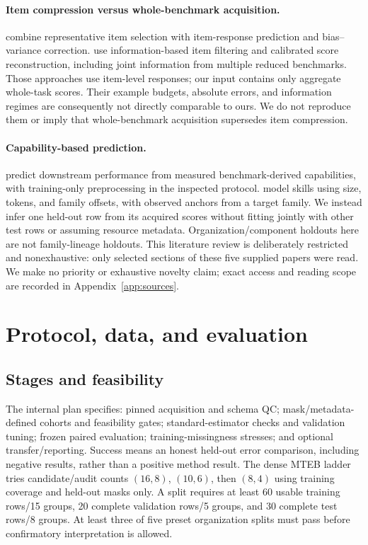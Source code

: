 \documentclass{article}
\begin{document}
\paragraph{Item compression versus whole-benchmark acquisition.}
\citet{maiapolo2024tinybenchmarks} combine representative item selection with item-response prediction and bias--variance correction. \citet{kipnis2024metabench} use information-based item filtering and calibrated score reconstruction, including joint information from multiple reduced benchmarks. Those approaches use item-level responses; our input contains only aggregate whole-task scores. Their example budgets, absolute errors, and information regimes are consequently not directly comparable to ours. We do not reproduce them or imply that whole-benchmark acquisition supersedes item compression.

\paragraph{Capability-based prediction.}
\citet{ruan2024observationalscaling} predict downstream performance from measured benchmark-derived capabilities, with training-only preprocessing in the inspected protocol. \citet{maiapolo2024sloth} model skills using size, tokens, and family offsets, with observed anchors from a target family. We instead infer one held-out row from its acquired scores without fitting jointly with other test rows or assuming resource metadata. Organization/component holdouts here are not family-lineage holdouts. This literature review is deliberately restricted and nonexhaustive: only selected sections of these five supplied papers were read. We make no priority or exhaustive novelty claim; exact access and reading scope are recorded in Appendix~\ref{app:sources}.

\section{Protocol, data, and evaluation}\label{sec:protocol}
\subsection{Stages and feasibility}
The internal plan specifies: pinned acquisition and schema QC; mask/metadata-defined cohorts and feasibility gates; standard-estimator checks and validation tuning; frozen paired evaluation; training-missingness stresses; and optional transfer/reporting. Success means an honest held-out error comparison, including negative results, rather than a positive method result. The dense MTEB ladder tries candidate/audit counts $(16,8)$, $(10,6)$, then $(8,4)$ using training coverage and held-out masks only. A split requires at least 60 usable training rows/15 groups, 20 complete validation rows/5 groups, and 30 complete test rows/8 groups. At least three of five preset organization splits must pass before confirmatory interpretation is allowed.
\end{document}
